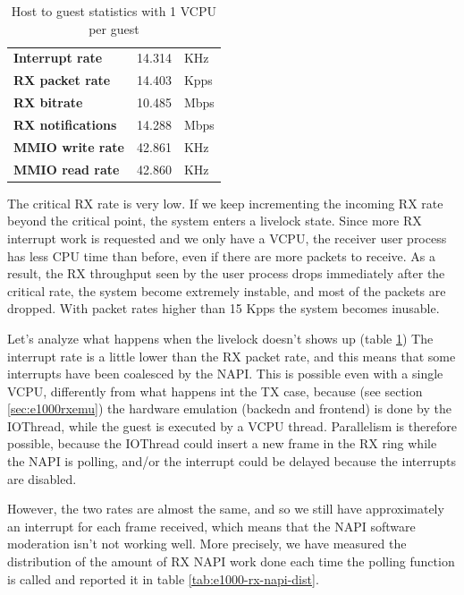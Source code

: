 \begin{table}
\begin{center}
\begin{tabular}{lrl}
\toprule
\textbf{Interrupt rate} & 14.314 & KHz\\
\textbf{RX packet rate} & 14.403 & Kpps\\
\textbf{RX bitrate} & 10.485 & Mbps\\
\textbf{RX notifications} & 14.288 & Mbps\\
\textbf{MMIO write rate} & 42.861 & KHz\\
\textbf{MMIO read rate} & 42.860 & KHz\\
\bottomrule
\end{tabular}
\end{center}
\caption[H2G with 1VCPU per guest]{Host to guest statistics with 1 VCPU per guest}
\label{tab:e1000-rx-g2h1vcpu}
\end{table}

The critical RX rate is very low. If we keep incrementing the incoming RX rate beyond the critical point, the system enters a livelock 
state. Since more RX interrupt work is requested and we only have a VCPU, the receiver user process has less CPU time than before, even
if there are more packets to receive. As a result, the RX throughput seen by the user process drops immediately after the critical rate,
the system become extremely instable, and most of the packets are dropped. With packet rates higher than 15 Kpps the system becomes
inusable.

\vspace{0.5cm}

Let's analyze what happens when the livelock doesn't shows up (table \ref{tab:e1000-rx-g2h1vcpu})
The interrupt rate is a little lower than the RX packet rate, and this means that some interrupts have been coalesced by the NAPI.
This is possible even with a single VCPU, differently from what happens int the TX case, because (see section \ref{sec:e1000rxemu})
the hardware emulation (backedn and frontend) is done by the IOThread, while the guest is executed by a VCPU thread. Parallelism is 
therefore possible, because the IOThread could insert a new frame in the RX ring while the NAPI is polling, and/or the interrupt could
be delayed because the interrupts are disabled.

However, the two rates are almost the same, and so we still have approximately an interrupt for each frame received, which means that
the NAPI software moderation isn't not working well. More precisely, we have measured the distribution of the amount of RX NAPI work
done each time the polling function is called and reported it in table \ref{tab:e1000-rx-napi-dist}.

